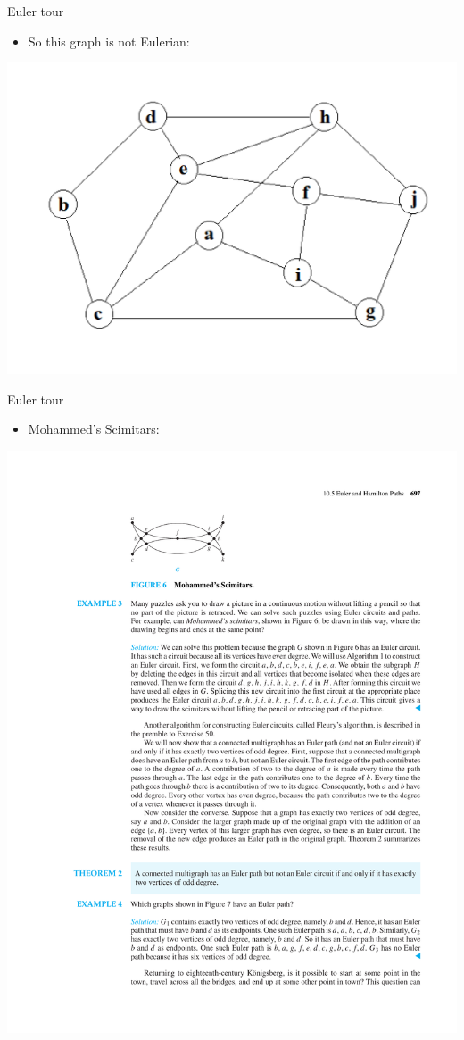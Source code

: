 \documentclass{beamer}
\theoremstyle{definition}
\begin{document}
\begin{frame}{Euler tour}
   \begin{itemize}
        \item So this graph is not Eulerian:
    \end{itemize}
    \centering \includegraphics[width=.6\linewidth]{p1.jpg}
\end{frame}

\begin{frame}{Euler tour}
   \begin{itemize}
        \item Mohammed's Scimitars:
    \end{itemize}
    \centering 
    \includegraphics[trim={5cm 22.5cm 10cm 2.5cm},clip,width=.75\linewidth]{p697}
\end{frame}
\end{document}
